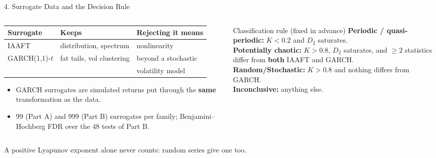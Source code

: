 \documentclass[aspectratio=169,10pt]{beamer}
\newcommand{\takeaway}[1]{\vspace{2pt}\begin{exampleblock}{}\small #1\end{exampleblock}}
\begin{document}
\begin{frame}{4. Surrogate Data and the Decision Rule}
    \begin{columns}[T]
        \begin{column}{0.52\textwidth}
            \centering
            \footnotesize
            \begin{tabular}{lll}
                \toprule
                Surrogate & Keeps & Rejecting it means \\
                \midrule
                IAAFT & distribution, spectrum & nonlinearity \\
                GARCH(1,1)-$t$ & fat tails, vol clustering & beyond a stochastic \\
                & & volatility model \\
                \bottomrule
            \end{tabular}
            \vspace{6pt}
            \raggedright
            \begin{itemize}\footnotesize
                \item GARCH surrogates are simulated returns put through the \textbf{same} transformation as the data.
                \item 99 (Part A) and 999 (Part B) surrogates per family; Benjamini--Hochberg FDR over the 48 tests of Part B.
            \end{itemize}
        \end{column}
        \begin{column}{0.45\textwidth}
            \begin{block}{Classification rule (fixed in advance)}
                \footnotesize
                \textbf{Periodic / quasi-periodic:} $K<0.2$ and $D_2$ saturates.\\[2pt]
                \textbf{Potentially chaotic:} $K>0.8$, $D_2$ saturates, and $\ge2$ statistics differ from \textbf{both} IAAFT and GARCH.\\[2pt]
                \textbf{Random/Stochastic:} $K>0.8$ and nothing differs from GARCH.\\[2pt]
                \textbf{Inconclusive:} anything else.
            \end{block}
        \end{column}
    \end{columns}
    \takeaway{A positive Lyapunov exponent alone never counts: random series give one too.}
\end{frame}
\end{document}
